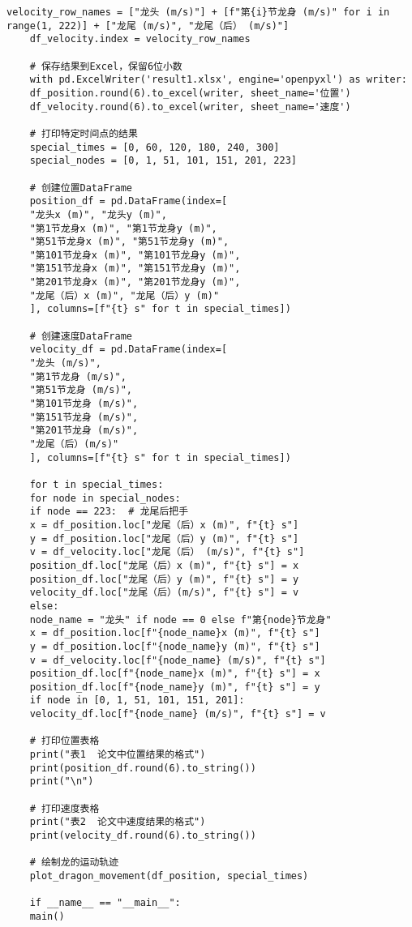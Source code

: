 \begin{lstlisting}[caption={问题一处理代码1}]
	velocity_row_names = ["龙头 (m/s)"] + [f"第{i}节龙身 (m/s)" for i in range(1, 222)] + ["龙尾 (m/s)", "龙尾（后） (m/s)"]
	df_velocity.index = velocity_row_names
	
	# 保存结果到Excel，保留6位小数
	with pd.ExcelWriter('result1.xlsx', engine='openpyxl') as writer:
	df_position.round(6).to_excel(writer, sheet_name='位置')
	df_velocity.round(6).to_excel(writer, sheet_name='速度')
	
	# 打印特定时间点的结果
	special_times = [0, 60, 120, 180, 240, 300]
	special_nodes = [0, 1, 51, 101, 151, 201, 223]
	
	# 创建位置DataFrame
	position_df = pd.DataFrame(index=[
	"龙头x (m)", "龙头y (m)",
	"第1节龙身x (m)", "第1节龙身y (m)",
	"第51节龙身x (m)", "第51节龙身y (m)",
	"第101节龙身x (m)", "第101节龙身y (m)",
	"第151节龙身x (m)", "第151节龙身y (m)",
	"第201节龙身x (m)", "第201节龙身y (m)",
	"龙尾（后）x (m)", "龙尾（后）y (m)"
	], columns=[f"{t} s" for t in special_times])
	
	# 创建速度DataFrame
	velocity_df = pd.DataFrame(index=[
	"龙头 (m/s)",
	"第1节龙身 (m/s)",
	"第51节龙身 (m/s)",
	"第101节龙身 (m/s)",
	"第151节龙身 (m/s)",
	"第201节龙身 (m/s)",
	"龙尾（后）(m/s)"
	], columns=[f"{t} s" for t in special_times])
	
	for t in special_times:
	for node in special_nodes:
	if node == 223:  # 龙尾后把手
	x = df_position.loc["龙尾（后）x (m)", f"{t} s"]
	y = df_position.loc["龙尾（后）y (m)", f"{t} s"]
	v = df_velocity.loc["龙尾（后） (m/s)", f"{t} s"]
	position_df.loc["龙尾（后）x (m)", f"{t} s"] = x
	position_df.loc["龙尾（后）y (m)", f"{t} s"] = y
	velocity_df.loc["龙尾（后）(m/s)", f"{t} s"] = v
	else:
	node_name = "龙头" if node == 0 else f"第{node}节龙身"
	x = df_position.loc[f"{node_name}x (m)", f"{t} s"]
	y = df_position.loc[f"{node_name}y (m)", f"{t} s"]
	v = df_velocity.loc[f"{node_name} (m/s)", f"{t} s"]
	position_df.loc[f"{node_name}x (m)", f"{t} s"] = x
	position_df.loc[f"{node_name}y (m)", f"{t} s"] = y
	if node in [0, 1, 51, 101, 151, 201]:
	velocity_df.loc[f"{node_name} (m/s)", f"{t} s"] = v
	
	# 打印位置表格
	print("表1  论文中位置结果的格式")
	print(position_df.round(6).to_string())
	print("\n")
	
	# 打印速度表格
	print("表2  论文中速度结果的格式")
	print(velocity_df.round(6).to_string())
	
	# 绘制龙的运动轨迹
	plot_dragon_movement(df_position, special_times)
	
	if __name__ == "__main__":
	main()
		
\end{lstlisting}





